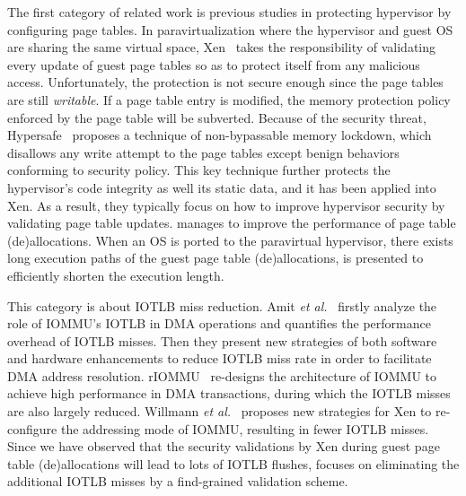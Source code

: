  The first category of related work is previous studies in protecting hypervisor by configuring page tables. In paravirtualization where the hypervisor and guest OS are sharing the same virtual space, Xen~\cite{barham2003xen} takes the responsibility of validating every update of guest page tables so as to protect itself from any malicious access. Unfortunately, the protection is not secure enough since the page tables are still \emph{writable}. If a page table entry is modified, the memory protection policy enforced by the page table will be subverted. Because of the security threat, Hypersafe~\cite{wang2010hypersafe} proposes a technique of non-bypassable memory lockdown, which disallows any write attempt to the page tables except benign behaviors conforming to security policy. This key technique further protects the hypervisor's code integrity as well its static data, and it has been applied into Xen.
As a result, they typically focus on how to improve hypervisor security by validating page table updates. \name manages to improve the performance of page table (de)allocations. When an OS is ported to the paravirtual hypervisor, there exists long execution paths of the guest page table (de)allocations, \name is presented to efficiently shorten the execution length.

 This category is about IOTLB miss reduction. Amit \emph{et al.}~\cite{amit2012iommu} firstly analyze the role of IOMMU's IOTLB in DMA operations and quantifies the performance overhead of IOTLB misses. Then they present new strategies of both software and hardware enhancements to reduce IOTLB miss rate in order to facilitate DMA address resolution. rIOMMU~\cite{malka2015riommu} re-designs the architecture of IOMMU to achieve high performance in DMA transactions, during which the IOTLB misses are also largely reduced. Willmann \emph{et al.}~\cite{willmann2008protection} proposes new strategies for Xen to re-configure the addressing mode of IOMMU, resulting in fewer IOTLB misses.
Since we have observed that the security validations by Xen during guest page table (de)allocations will lead to lots of IOTLB flushes, \name focuses on eliminating the additional IOTLB misses by a find-grained validation scheme.


